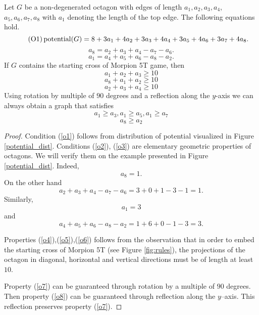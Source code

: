 \begin{lemma}\label{lem:octagons}
  Let $G$ be a non-degenerated octagon with edges of length $a_1, a_2, a_3, a_4$, $a_5, a_6, a_7, a_8$ with $a_1$ denoting the length of the top edge.
  The following equations hold.
  \begin{equation}
  	\tag{O1}
    \label{o1}
    \operatorname{potential}(G) = 8 + 3a_1+4a_2+3a_3+4a_4+3a_5+4a_6+3a_7+4a_8. 
  \end{equation}
  \begin{equation}
  	\tag{O2}
    \label{o2}
    a_8 = a_2 + a_3 + a_4 - a_7 - a_6. 
  \end{equation}
  \begin{equation}
  	\tag{O3}
    \label{o3}
    a_1 = a_4 + a_5 + a_6 - a_8 - a_2. 
  \end{equation}
  If $G$ contains the starting cross of Morpion 5T game, then
  \begin{equation}
  	\tag{O4}
    \label{o4}
    a_1 + a_2 + a_ 3 \geq 10 
  \end{equation}
  \begin{equation}
  	\tag{O5}
    \label{o5}
    a_8 + a_1 + a_ 2 \geq 10 
  \end{equation}
  \begin{equation}
  	\tag{O6}
    \label{o6}
    a_2 + a_3 + a_4 \geq 10 
  \end{equation}
  Using rotation by multiple of $90$ degrees and a reflection along the $y$-axis we can always obtain a graph that satisfies
  \begin{equation}
  	\tag{O7}
    \label{o7}
    a_1 \geq a_3, a_1 \geq a_5, a_1 \geq a_7 
  \end{equation}
  \begin{equation}
  	\tag{O8}
    \label{o8}
    a_8 \geq a_2
  \end{equation}
\end{lemma}
\begin{proof}
Condition (\ref{o1}) follows from distribution of potential visualized in Figure \ref{potential_dist}.
Conditions (\ref{o2}), (\ref{o3}) are elementary geometric properties of octagons. We will verify them on the example presented in Figure \ref{potential_dist}. Indeed, \[ a_8 = 1. \]
On the other hand \[ a_2+a_3+a_4-a_7-a_6=3+0+1-3-1=1. \]
Similarly, \[ a_1 = 3 \]
and \[ a_4+a_5+a_6-a_8-a_2=1+6+0-1-3=3. \]

Properties (\ref{o4}),(\ref{o5}),(\ref{o6}) follows from the observation that in order to embed the starting cross of Morpion 5T (see Figure \ref{fig:rules}), the projections of the octagon in diagonal, horizontal and vertical directions must be of length at least $10$. 

Property (\ref{o7}) can be guaranteed through rotation by a multiple of $90$ degrees. Then 
property (\ref{o8}) can be guaranteed through reflection along the $y$--axis. This reflection preserves property (\ref{o7}).
\end{proof}

